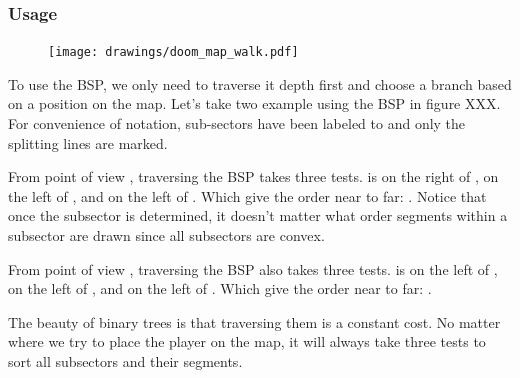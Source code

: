 \subsubsection{Usage}

\begin{figure}
\centering
\texttt{[image: drawings/doom\_map\_walk.pdf]}
\end{figure}
To use the BSP, we only need to traverse it depth first and choose a branch based on a position on the map. Let's take two example using the BSP in figure XXX. For convenience of notation, sub-sectors have been labeled  to  and only the splitting lines are marked.\\
\par
From point of view , traversing the BSP takes three tests.  is on the right of , on the left of , and on the left of . Which give the order near to far: . Notice that once the subsector is determined, it doesn't matter what order segments within a subsector are drawn since all subsectors are convex.\\
\par
From point of view , traversing the BSP also takes three tests.  is on the left of , on the left of , and on the left of . Which give the order near to far: .\\
\par
The beauty of binary trees is that traversing them is a constant cost. No matter where we try to place the player on the map, it will always take three tests to sort all subsectors and their segments.
\pagebreak




